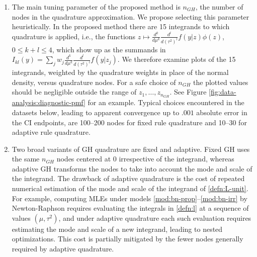 \documentclass[12pt]{article}
\newcommand{\F}{I}
\newcommand{\z}{z}
\newcommand{\y}{y}
\newcommand{\nGH}{n_{GH}}
\newcommand{\w}{w}
\newcommand{\effect}{\mu}
\newcommand{\comment}[2][red]{%
 \iftoggle{commenttoggle}{%
  {\normalsize{\color{#1}{#2}}\normalsize}%
 }{%
 }%
}
\begin{document}
\begin{enumerate}


\item The main tuning parameter of the proposed method is $\nGH$, the
  number of nodes in the quadrature approximation. We propose selecting
  this parameter heuristically. In the proposed method there are 15
  integrands to which quadrature is applied, i.e., the functions $z\mapsto \frac{d^k}{d\mu^k}\frac{d^l}{d(\tau^2)^l}
  f(y|\z)\phi(z)$, $0\le k+l \le 4$, which show up as the summands in
  $\F_{kl}(\y)=\sum_{j} \w_j \frac{d^k}{d\mu^k}\frac{d^l}{d(\tau^2)^l}
  f(y|\z_j)$. We therefore examine plots of the 15
  integrands, weighted by the quadrature weights in place of the
  normal density, versus quadrature nodes. For a safe choice of $\nGH$ the plotted values should be negligible outside the range of $z_1,\ldots,z_{\nGH}$. See Figure \ref{fig:data-analysis:diagnostic-pmf} for an
  example. Typical choices encountered in the datasets below, leading
  to apparent convergence up to $.001$ absolute error in the CI
  endpoints, are 100--200 nodes for fixed rule quadrature and 10--30
  for adaptive rule quadrature.


\item Two broad variants of GH quadrature are fixed and
  adaptive. Fixed GH uses the same $\nGH$  nodes centered at $0$
  irrespective of the integrand, whereas adaptive GH
  transforms the nodes to take into account the mode and scale of the
  integrand. The drawback of adaptive quadrature is the cost of
  repeated numerical estimation of the mode and scale of the
  integrand of \eqref{defn:L-unit}. For example, computing  MLEs
  under models \eqref{mod:bn-prop}--\eqref{mod:bn-irr} by Newton-Raphson requires evaluating the
  integrals in \eqref{defn:l} at a sequence of values $(\effect,\tau^2)$, and
  under adaptive quadrature each such evaluation requires estimating
  the mode and scale of a new integrand, leading to nested
  optimizations. This cost is partially mitigated by the fewer nodes
  generally required by adaptive quadrature.


\end{enumerate}
\end{document}
